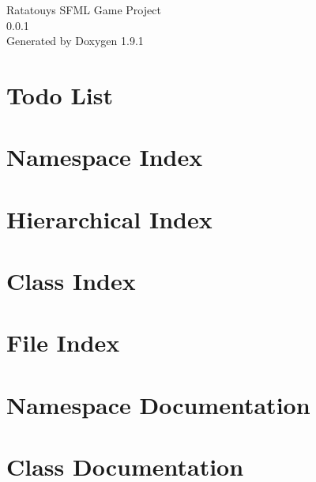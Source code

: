 \let\mypdfximage\pdfximage\def\pdfximage{\immediate\mypdfximage}\documentclass[twoside]{book}
\newcommand{\+}{\discretionary{\mbox{\scriptsize$\hookleftarrow$}}{}{}}
\newcommand{\clearemptydoublepage}{%
  \newpage{\pagestyle{empty}\cleardoublepage}%
}
\begin{document}
\raggedbottom

\hypersetup{pageanchor=false,
             bookmarksnumbered=true,
             pdfencoding=unicode
            }
\begin{titlepage}
\vspace*{7cm}
\begin{center}%
{\Large Ratatouy\textquotesingle{}s SFML Game Project \\[1ex]\large 0.\+0.\+1 }\\
\vspace*{1cm}
{\large Generated by Doxygen 1.9.1}\\
\end{center}
\end{titlepage}
\clearemptydoublepage
{}
\tableofcontents
\clearemptydoublepage
{}
\hypersetup{pageanchor=true}

\chapter{Todo List}
\label{todo}

\chapter{Namespace Index}

\chapter{Hierarchical Index}

\chapter{Class Index}

\chapter{File Index}

\chapter{Namespace Documentation}

\chapter{Class Documentation}



























\end{document}
